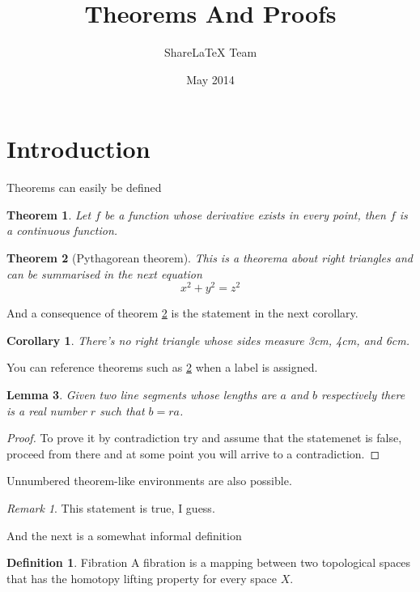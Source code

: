 \documentclass{article}
\title{Theorems And Proofs}
\author{ShareLaTeX Team }
\date{May 2014}
\newtheorem{theorem}{Theorem}[section]
\newtheorem{corollary}{Corollary}[theorem]
\newtheorem{lemma}[theorem]{Lemma}
\theoremstyle{remark}
\newtheorem*{remark}{Remark}
\theoremstyle{definition}
\newtheorem{definition}{Definition}[section]
\begin{document}
\maketitle

\section{Introduction}
Theorems can easily be defined

\begin{theorem}
Let $f$ be a function whose derivative exists in every point, then $f$ is a continuous function.
\end{theorem}

\begin{theorem}[Pythagorean theorem]
\label{pythagorean}
This is a theorema about right triangles and can be summarised in the next equation 
\[ x^2 + y^2 = z^2 \]
\end{theorem}

And a consequence of theorem \ref{pythagorean} is the statement in the next corollary.

\begin{corollary}
There's no right triangle whose sides measure 3cm, 4cm, and 6cm.
\end{corollary}

You can reference theorems such as \ref{pythagorean} when a label is assigned.

\begin{lemma}
Given two line segments whose lengths are $a$ and $b$ respectively there is a real number $r$ such that $b=ra$.
\end{lemma}

\begin{proof}
To prove it by contradiction try and assume that the statemenet is false, proceed from there and at some point you will arrive to a contradiction.
\end{proof}

Unnumbered theorem-like environments are also possible.

\begin{remark}
This statement is true, I guess.
\end{remark}

And the next is a somewhat informal definition

\theoremstyle{definition}
\begin{definition}{Fibration}
A fibration is a mapping between two topological spaces that has the homotopy lifting property for every space $X$.
\end{definition}
\end{document}

